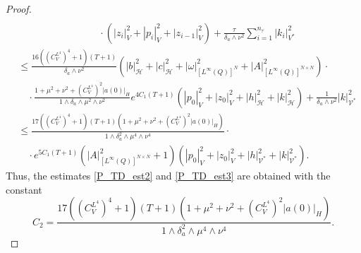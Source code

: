 \documentclass{sinst}
\numberwithin{equation}{section}
\theoremstyle{plain}
\theoremstyle{definition}
\def\sH{\mathscr{H}}
\def\sV{\mathscr{V}}
\begin{document}
\begin{proof}
\begin{align}
    \\
    &\qquad \cdot (|z_i|_V^2 + |p_i|_V^2 + |z_{i-1}|_V^2) + \frac{\tau}{\delta_a \wedge \nu^2}\sum_{i=1}^{n_\tau} |k_i|_{V^*}^2
  \end{align}
  \begin{align}
    &\leq \frac{16((C_V^{L^4})^4 + 1)(T + 1)}{\delta_a \wedge \nu^2} (|b|_\sH^2 + |c|_\sH^2 + |\omega|_{[L^\infty(Q)]^N}^2 + |A|_{[L^\infty(Q)]^{N \times N}}^2) \cdot
    \\
    &\quad \cdot \frac{1 + \mu^2 + \nu^2 + (C_V^{L^4})^2|a(0)|_H}{1 \wedge \delta_a \wedge \mu^2 \wedge \nu^2} e^{4C_1(T+1)} (|p_0|_V^2 + |z_0|_V^2 + |h|_\sH^2 + |k|_\sH^2) + \frac{1}{\delta_a \wedge \nu^2}|k|_{\sV^*}^2
    \\
    &\leq \frac{17((C_V^{L^4})^4 + 1)(T + 1)(1 + \mu^2 + \nu^2 + (C_V^{L^4})^2|a(0)|_H)}{1 \wedge \delta_a^2 \wedge \mu^4 \wedge \nu^4} \cdot
    \\
    &\quad \cdot e^{5 C_1 (T+1)} (|A|_{[L^\infty(Q)]^{N \times N}}^2 + 1) (|p_0|_V^2 + |z_0|_V^2 + |h|_{\sV^*}^2 + |k|_{\sV^*}^2).
  \end{align}
  Thus, the estimates \eqref{P_TD_est2} and \eqref{P_TD_est3} are obtained with the constant
  \begin{equation}
    C_2 = \frac{17((C_V^{L^4})^4 + 1)(T + 1)(1 + \mu^2 + \nu^2 + (C_V^{L^4})^2|a(0)|_H)}{1 \wedge \delta_a^2 \wedge \mu^4 \wedge \nu^4}.
  \end{equation}
\end{proof}
\end{document}
